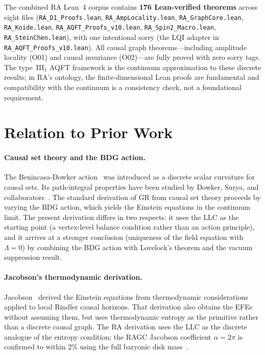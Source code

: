 \documentclass[11pt,a4paper]{article}
\begin{document}
The combined RA Lean~4 corpus contains \textbf{176 Lean-verified theorems}
across eight files (\texttt{RA\_D1\_Proofs.lean},
\texttt{RA\_AmpLocality.lean}, \texttt{RA\_GraphCore.lean},
\texttt{RA\_Koide.lean}, \texttt{RA\_AQFT\_Proofs\_v10.lean},
\texttt{RA\_Spin2\_Macro.lean}, \texttt{RA\_SteinChen.lean}),
with one intentional sorry (the LQI adapter in
\texttt{RA\_AQFT\_Proofs\_v10.lean}).
All causal graph theorems---including amplitude locality (O01) and
causal invariance (O02)---are fully proved with zero sorry tags.
The type~III$_1$ AQFT framework is the continuum approximation to
these discrete results; in RA's ontology, the finite-dimensional
Lean proofs are fundamental and compatibility with the continuum
is a consistency check, not a foundational requirement.

\section{Relation to Prior Work}
\label{sec:related}

\paragraph{Causal set theory and the BDG action.}
The Benincasa-Dowker action~\citep{Benincasa2010} was introduced as a
discrete scalar curvature for causal sets. Its path-integral
properties have been studied by Dowker, Surya, and
collaborators~\citep{Dowker2013}. The standard derivation of GR from
causal set theory proceeds by varying the BDG action, which yields
the Einstein equations in the continuum limit. The present derivation
differs in two respects: it uses the LLC as the starting point (a
vertex-level balance condition rather than an action principle), and
it arrives at a stronger conclusion (uniqueness of the field equation
with $\Lambda = 0$) by combining the BDG action with Lovelock's theorem
and the vacuum suppression result.

\paragraph{Jacobson's thermodynamic derivation.}
Jacobson~\citep{Jacobson1995} derived the Einstein equations from
thermodynamic considerations applied to local Rindler causal horizons.
That derivation also obtains the EFEs without assuming them, but
uses thermodynamic entropy as the primitive rather than a discrete
causal graph. The RA derivation uses the LLC as the discrete analogue
of the entropy condition; the RAGC Jacobson coefficient
$\alpha = 2\pi$ is confirmed to within 2\% using the full baryonic
disk mass~\citep{Sandeman2026RAGC,BlandHawthorn2016}.
\end{document}

